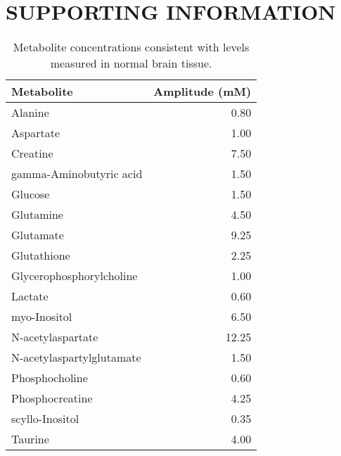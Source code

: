 \documentclass[num-refs]{wiley-article}
\begin{document}
\section*{SUPPORTING INFORMATION}

\begin{table}[ht]
\begin{center}
\begin{tabular}{l r}
  \hline
  Metabolite & Amplitude (mM) \\
  \hline
  Alanine & 0.80 \\
  Aspartate & 1.00 \\
  Creatine & 7.50 \\
  gamma-Aminobutyric acid & 1.50 \\
  Glucose & 1.50 \\
  Glutamine & 4.50 \\
  Glutamate & 9.25 \\
  Glutathione & 2.25 \\
  Glycerophosphorylcholine & 1.00 \\
  Lactate & 0.60 \\
  myo-Inositol & 6.50 \\
  N-acetylaspartate & 12.25 \\
  N-acetylaspartylglutamate & 1.50 \\
  Phosphocholine & 0.60 \\
  Phosphocreatine & 4.25 \\
  scyllo-Inositol & 0.35 \\
  Taurine & 4.00 \\
  \hline
\end{tabular}
\end{center}
\caption{Metabolite concentrations consistent with levels measured in normal brain tissue.}
\label{metab_tab}
\end{table}
\end{document}
